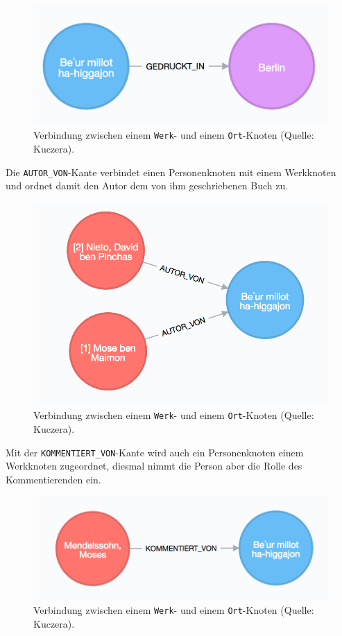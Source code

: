 \begin{figure}
\centering
\includegraphics{Bilder/Werk-Ort.png}
\caption{Verbindung zwischen einem \texttt{Werk}- und einem
\texttt{Ort}-Knoten (Quelle: Kuczera).}
\end{figure}

Die \texttt{AUTOR\_VON}-Kante verbindet einen Personenknoten mit einem
Werkknoten und ordnet damit den Autor dem von ihm geschriebenen Buch zu.

\begin{figure}
\centering
\includegraphics{Bilder/Werk-Autor.png}
\caption{Verbindung zwischen einem \texttt{Werk}- und einem
\texttt{Ort}-Knoten (Quelle: Kuczera).}
\end{figure}

Mit der \texttt{KOMMENTIERT\_VON}-Kante wird auch ein Personenknoten
einem Werkknoten zugeordnet, diesmal nimmt die Person aber die Rolle des
Kommentierenden ein.

\begin{figure}
\centering
\includegraphics{Bilder/Werk-Kommentator.png}
\caption{Verbindung zwischen einem \texttt{Werk}- und einem
\texttt{Ort}-Knoten (Quelle: Kuczera).}
\end{figure}

